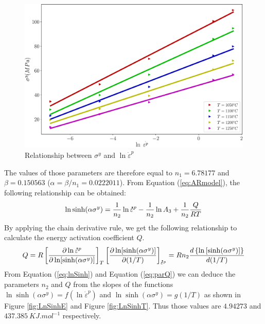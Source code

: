 \documentclass[twoside,english,1p,final,sort&compress]{elsarticle}
\theoremstyle{plain}
\newcommand{\mdot}[1]{\accentset{\mbox{\bfseries .}}{#1}}
\begin{document}
\begin{figure}[!ht]
\centering
\includegraphics[width=0.9\columnwidth]{Figures/LnSinhE0}
\caption{Relationship between $\sigma^y$ and $\ln \dot{\varepsilon}^p$}
\label{fig:LnSinhE0}
\end{figure}
The values of those parameters are therefore equal to $n_1=6.78177$ and $\beta=0.150563$ ($\alpha=\beta/n_1 = 0.0222011$).
From Equation (\ref{eq:ARmodel}), the following relationship can be obtained:
\begin{equation}
\label{eq:lnSinh}
\ln\sinh(\alpha\sigma^y) = \frac{1}{n_2}\ln \mdot{\varepsilon}^p  -  \frac{1}{n_2}\ln A_3 + \frac{1}{n_2} \frac{Q}{RT}
\end{equation}
By applying the chain derivative rule, we get the following relationship to calculate the energy activation coefficient $Q$.
\begin{equation}
\label{eq:parQ}
Q = R\left[\frac{\partial \ln \mdot{\varepsilon}^p}{\partial \ln [\sinh(\alpha\sigma^y)]}\right]_{T}\left[\frac{\partial \ln [\sinh(\alpha\sigma^y)]}{\partial (1/T)}\right]_{\mdot{\varepsilon}^p}= Rn_2\frac{d\left\{\ln\left[\sinh(\alpha\sigma^y)\right]\right\}}{d(1/T)}
\end{equation}
From Equation (\ref{eq:lnSinh}) and Equation (\ref{eq:parQ}) we can deduce the parameters $n_2 $ and $Q $ from the slopes of the functions $\ln \sinh(\alpha\sigma^y) = f(\ln \dot{\varepsilon}^p)$ and $\ln \sinh(\alpha\sigma^y) = g(1/T)$ as shown in Figure \ref{fig:LnSinhE} and Figure \ref{fig:LnSinhT}. Thus those values are $4.94273$ and $437.385\ KJ.mol^{-1}$ respectively.
\end{document}
